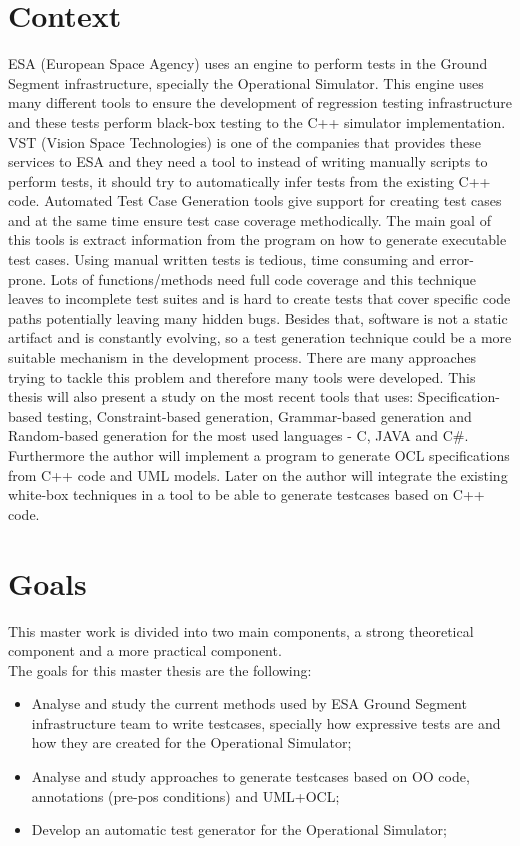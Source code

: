 \documentclass[a4paper,12pt]{article}
\begin{document}
\section{\Large Context}
ESA (European Space Agency) uses an engine to perform tests in the Ground Segment infrastructure, specially the Operational Simulator.
This engine uses many different tools to ensure the development of regression testing infrastructure and
these tests perform black-box testing to the C++ simulator implementation.
VST (Vision Space Technologies) is one of the companies that provides these services to ESA and they need a tool to
instead of writing manually scripts to perform tests, it should try to automatically infer tests from the existing C++ code.
Automated Test Case Generation tools give support for creating test cases and at the same time ensure test case coverage methodically.
The main goal of this tools is extract information from the program on how to generate executable test cases.
Using manual written tests is tedious, time consuming and error-prone.
Lots of functions/methods need full code coverage and this technique leaves to incomplete test suites and is hard to
create tests that cover specific code paths potentially leaving many hidden bugs.
Besides that, software is not a static artifact and is constantly evolving, so a test generation technique could be a more suitable mechanism in the development process.
There are many approaches trying to tackle this problem and therefore many tools were developed. This thesis will also present a study on the most
recent tools that uses: Specification-based testing, Constraint-based generation, Grammar-based generation and Random-based generation
for the most used languages - C, JAVA and C\#.
Furthermore the author will implement a program to generate OCL specifications from C++ code and UML models. Later on the author will integrate the
existing white-box techniques in a tool to be able to generate testcases based on C++ code.

\section{\Large Goals}
This master work is divided into two main components, a strong theoretical component and a more practical component.\\[6pt]
The goals for this master thesis are the following:
\begin{itemize}
\item Analyse and study the current methods used by ESA Ground Segment infrastructure team to write testcases, specially how expressive tests are and how they are created for the Operational Simulator;
\item Analyse and study approaches to generate testcases based on OO code, annotations (pre-pos conditions) and UML+OCL;
\item Develop an automatic test generator for the Operational Simulator;
\end{itemize}
\end{document}
